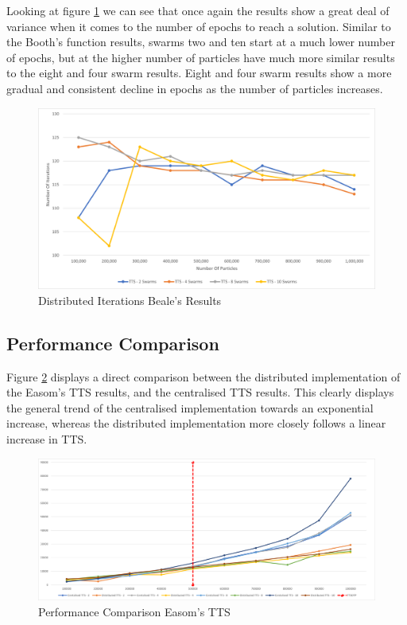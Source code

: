\documentclass[oneside,12pt]{book}
\begin{document}
Looking at figure \ref{fig:Distributed_Epoc_Beale_Results} we can see that once again the results show a great deal of variance when it comes to the number of epochs to reach a solution. Similar to the Booth's function results, swarms two and ten start at a much lower number of epochs, but at the higher number of particles have much more similar results to the eight and four swarm results. Eight and four swarm results show a more gradual and consistent decline in epochs as the number of particles increases. 

\begin{figure}[H]
    \centering
    \includegraphics[scale=0.45]{Images/Graphs/DistributedBealeEpoch.png}
    \caption{Distributed Iterations Beale's Results}
    \label{fig:Distributed_Epoc_Beale_Results}
\end{figure}

\subsection{Performance Comparison}
Figure \ref{fig:PerformanceComparisonEasomTTS} displays a direct comparison between the distributed implementation of the Easom's TTS results, and the centralised TTS results. This clearly displays the general trend of the centralised implementation towards an exponential increase, whereas the distributed implementation more closely follows a linear increase in TTS.  
\begin{figure}[H]
    \centering
    \includegraphics[scale=0.45]{Images/Graphs/PerformanceComparisonEasomTTS.png}
    \caption{Performance Comparison Easom's TTS}
    \label{fig:PerformanceComparisonEasomTTS}
\end{figure}
\end{document}
